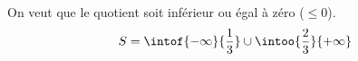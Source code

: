 \begin{methode}
\begin{correction}
		On veut que le quotient soit inférieur ou égal à zéro ($\le 0$).
		\[
			S = \intof{-\infty}{\dfrac{1}{3}} \cup \intoo{\dfrac{2}{3}}{+\infty}
		\]
	\end{correction}
\end{methode}
